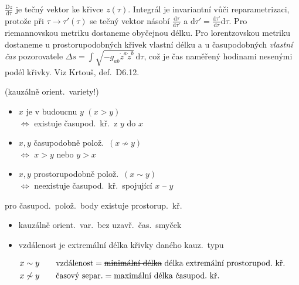 \begin{vysvetleni}
$\frac{\mathrm{D}z}{\mathrm{d}\tau}$ je tečný vektor ke křivce $z(\tau)$. Integrál je invariantní vůči reparametrizaci, protože při $\tau\to\tau'(\tau)$ se tečný vektor násobí $\frac{\mathrm{d}\tau}{\mathrm{d}\tau'}$ a $\mathrm{d}\tau'=\frac{\mathrm{d}\tau'}{\mathrm{d}\tau}\mathrm{d}\tau$.
Pro riemannovskou metriku dostaneme obyčejnou délku. Pro lorentzovskou metriku dostaneme u prostorupodobných křivek vlastní délku a u časupodobných \emph{vlastní čas} pozorovatele $\Delta s=\int\sqrt{-g_{ab}\dot z^a\dot z^b}\,\mathrm{d}\tau$, což je čas naměřený hodinami nesenými podél křivky.
Viz Krtouš, def.~D6.12.
\end{vysvetleni}

 \quad (kauzálně orient.\ variety!)

\begin{minipage}{0.68\textwidth}
\begin{itemize}[nosep]
  \item[] $x$ je v budoucnu $y$ \quad $(x > y)$ \\
          \quad $\Leftrightarrow$ existuje časupod.\ kř.\ z $y$ do $x$
  \item[] $x,y$ časupodobně polož.\ \quad $(x\not\sim y)$ \\
          \quad $\Leftrightarrow$ $x > y$ nebo $y > x$
  \item[] $x,y$ prostorupodobně polož.\ \quad $(x\sim y)$ \\
          \quad $\Leftrightarrow$ neexistuje časupod.\ kř.\ spojující $x$ -- $y$
\end{itemize}
\end{minipage}
\hfill
\begin{minipage}{0.3\textwidth}
 pro časupod.\ polož.\ body existuje prostorup.\ kř.

\centering
{}
\end{minipage}

\begin{itemize}[nosep]
  \item[] kauzálně orient.\ var.\ bez uzavř.\ čas.\ smyček
  \item[] vzdálenost je extremální délka křivky daného kauz.\ typu
\end{itemize}
\begin{align*}
  x\sim y &\qquad \text{vzdálenost} = \text{\sout{minimální délka}}\ \text{délka extremální prostorupod.\ kř.} \\
  x\not\sim y &\qquad \text{časový separ.} = \text{maximální délka časupod.\ kř.}
\end{align*}

